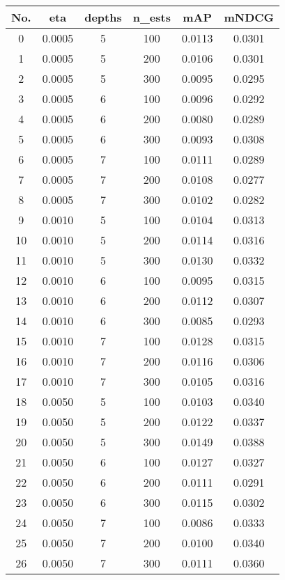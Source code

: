 \begin{center}
    \begin{tabular}{cccccc}
    \hline
    \textbf{No.} & \textbf{eta} & \textbf{depths} & \textbf{n\_ests} & \textbf{mAP} & \textbf{mNDCG} \\
    \hline
    0  & 0.0005 & 5 & 100 & 0.0113 & 0.0301 \\
    1  & 0.0005 & 5 & 200 & 0.0106 & 0.0301 \\
    2  & 0.0005 & 5 & 300 & 0.0095 & 0.0295 \\
    3  & 0.0005 & 6 & 100 & 0.0096 & 0.0292 \\
    4  & 0.0005 & 6 & 200 & 0.0080 & 0.0289 \\
    5  & 0.0005 & 6 & 300 & 0.0093 & 0.0308 \\
    6  & 0.0005 & 7 & 100 & 0.0111 & 0.0289 \\
    7  & 0.0005 & 7 & 200 & 0.0108 & 0.0277 \\
    8  & 0.0005 & 7 & 300 & 0.0102 & 0.0282 \\
    9  & 0.0010 & 5 & 100 & 0.0104 & 0.0313 \\
    10 & 0.0010 & 5 & 200 & 0.0114 & 0.0316 \\
    11 & 0.0010 & 5 & 300 & 0.0130 & 0.0332 \\
    12 & 0.0010 & 6 & 100 & 0.0095 & 0.0315 \\
    13 & 0.0010 & 6 & 200 & 0.0112 & 0.0307 \\
    14 & 0.0010 & 6 & 300 & 0.0085 & 0.0293 \\
    15 & 0.0010 & 7 & 100 & 0.0128 & 0.0315 \\
    16 & 0.0010 & 7 & 200 & 0.0116 & 0.0306 \\
    17 & 0.0010 & 7 & 300 & 0.0105 & 0.0316 \\
    18 & 0.0050 & 5 & 100 & 0.0103 & 0.0340 \\
    19 & 0.0050 & 5 & 200 & 0.0122 & 0.0337 \\
    \hline
    20 & 0.0050 & 5 & 300 & 0.0149 & 0.0388 \\
    \hline
    21 & 0.0050 & 6 & 100 & 0.0127 & 0.0327 \\
    22 & 0.0050 & 6 & 200 & 0.0111 & 0.0291 \\
    23 & 0.0050 & 6 & 300 & 0.0115 & 0.0302 \\
    24 & 0.0050 & 7 & 100 & 0.0086 & 0.0333 \\
    25 & 0.0050 & 7 & 200 & 0.0100 & 0.0340 \\
    26 & 0.0050 & 7 & 300 & 0.0111 & 0.0360 \\

\end{tabular}
\end{center}
